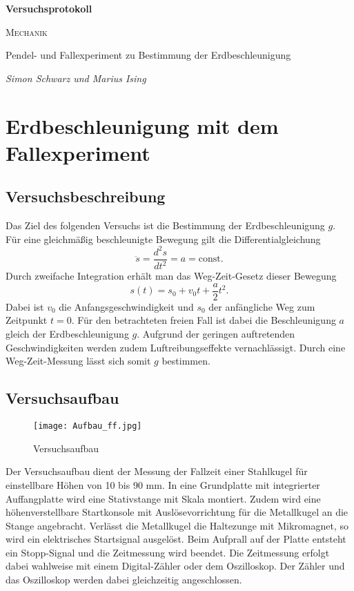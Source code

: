 \documentclass[a4paper, 12pt]{scrartcl}
\begin{document}
\begin{titlepage}
	\centering
	{\Huge\bfseries Versuchsprotokoll\par}
	\vspace{2cm}
	{\scshape\LARGE Mechanik \par}
	\vspace{1cm}
	{\Large Pendel- und Fallexperiment zu Bestimmung der Erdbeschleunigung\par}
	\vfill
	{\large\itshape Simon Schwarz und Marius Ising\par}

	\vfill
\end{titlepage}

\tableofcontents
\newpage

\section{Erdbeschleunigung mit dem Fallexperiment}


\subsection{Versuchsbeschreibung}

Das Ziel des folgenden Versuchs ist die Bestimmung der Erdbeschleunigung $g$. Für eine gleichmäßig beschleunigte Bewegung gilt die Differentialgleichung
$$\ddot s = \frac{d^2s}{dt^2} = a = \mathrm{const}.$$
Durch zweifache Integration erhält man das Weg-Zeit-Gesetz dieser Bewegung
$$s(t) = s_0 + v_0t + \frac a2 t^2.$$
Dabei ist $v_0$ die Anfangsgeschwindigkeit und $s_0$ der anfängliche Weg zum Zeitpunkt $t=0$. Für den betrachteten freien Fall ist dabei die Beschleunigung $a$ gleich der Erdbeschleunigung $g$. Aufgrund der geringen auftretenden Geschwindigkeiten werden zudem Luftreibungseffekte vernachlässigt. Durch eine Weg-Zeit-Messung lässt sich somit $g$ bestimmen.


\subsection{Versuchsaufbau}

\begin{figure}[h]
	\centering
		\texttt{[image: Aufbau\_ff.jpg]}
	\caption{Versuchsaufbau}
\end{figure}
Der Versuchsaufbau dient der Messung der Fallzeit einer Stahlkugel für einstellbare Höhen von 10 bis 90 mm. In eine Grundplatte mit integrierter Auffangplatte wird eine Stativstange mit Skala montiert. Zudem wird eine höhenverstellbare Startkonsole mit Auslösevorrichtung für die Metallkugel an die Stange angebracht. Verlässt die Metallkugel die Haltezunge mit Mikromagnet, so wird ein elektrisches Startsignal ausgelöst. Beim Aufprall auf der Platte entsteht ein Stopp-Signal und die Zeitmessung wird beendet. Die Zeitmessung erfolgt dabei wahlweise mit einem Digital-Zähler oder dem Oszilloskop. Der Zähler und das Oszilloskop werden dabei gleichzeitig angeschlossen.
\end{document}
